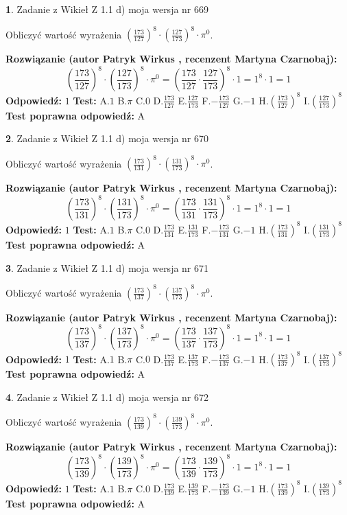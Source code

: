 \documentclass[12pt, a4paper]{article}
\theoremstyle{definition} %
\newtheorem{zad}{}
\newcommand{\zadStart}[1]{\begin{zad}#1\newline}
\newcommand{\zadStop}{\end{zad}}
\newcommand{\rozwStart}[2]{\noindent \textbf{Rozwiązanie (autor #1 , recenzent #2): }\newline}
\newcommand{\rozwStop}{\newline}
\newcommand{\odpStart}{\noindent \textbf{Odpowiedź:}\newline}
\newcommand{\odpStop}{\newline}
\newcommand{\testStart}{\noindent \textbf{Test:}\newline}
\newcommand{\testStop}{\newline}
\newcommand{\kluczStart}{\noindent \textbf{Test poprawna odpowiedź:}\newline}
\newcommand{\kluczStop}{\newline}
\begin{document}
\zadStart{Zadanie z Wikieł Z 1.1 d) moja wersja nr 669}

Obliczyć wartość wyrażenia $(\frac{173}{127})^{8} \cdot (\frac{127}{173})^{8} \cdot \pi^{0}$.
\zadStop
\rozwStart{Patryk Wirkus}{Martyna Czarnobaj}
$$(\frac{173}{127})^{8} \cdot (\frac{127}{173})^{8} \cdot \pi^{0} = (\frac{173}{127} \cdot \frac{127}{173})^{8} \cdot 1 = 1^{8} \cdot 1 = 1$$
\rozwStop
\odpStart
$1$
\odpStop
\testStart
A.$1$ B.$\pi$ C.$0$ D.$\frac{173}{127}$ E.$\frac{127}{173}$
F.$-\frac{173}{127}$ G.$-1$
H.$(\frac{173}{127})^{8}$
I.$(\frac{127}{173})^{8}$
\testStop
\kluczStart
A
\kluczStop



\zadStart{Zadanie z Wikieł Z 1.1 d) moja wersja nr 670}

Obliczyć wartość wyrażenia $(\frac{173}{131})^{8} \cdot (\frac{131}{173})^{8} \cdot \pi^{0}$.
\zadStop
\rozwStart{Patryk Wirkus}{Martyna Czarnobaj}
$$(\frac{173}{131})^{8} \cdot (\frac{131}{173})^{8} \cdot \pi^{0} = (\frac{173}{131} \cdot \frac{131}{173})^{8} \cdot 1 = 1^{8} \cdot 1 = 1$$
\rozwStop
\odpStart
$1$
\odpStop
\testStart
A.$1$ B.$\pi$ C.$0$ D.$\frac{173}{131}$ E.$\frac{131}{173}$
F.$-\frac{173}{131}$ G.$-1$
H.$(\frac{173}{131})^{8}$
I.$(\frac{131}{173})^{8}$
\testStop
\kluczStart
A
\kluczStop



\zadStart{Zadanie z Wikieł Z 1.1 d) moja wersja nr 671}

Obliczyć wartość wyrażenia $(\frac{173}{137})^{8} \cdot (\frac{137}{173})^{8} \cdot \pi^{0}$.
\zadStop
\rozwStart{Patryk Wirkus}{Martyna Czarnobaj}
$$(\frac{173}{137})^{8} \cdot (\frac{137}{173})^{8} \cdot \pi^{0} = (\frac{173}{137} \cdot \frac{137}{173})^{8} \cdot 1 = 1^{8} \cdot 1 = 1$$
\rozwStop
\odpStart
$1$
\odpStop
\testStart
A.$1$ B.$\pi$ C.$0$ D.$\frac{173}{137}$ E.$\frac{137}{173}$
F.$-\frac{173}{137}$ G.$-1$
H.$(\frac{173}{137})^{8}$
I.$(\frac{137}{173})^{8}$
\testStop
\kluczStart
A
\kluczStop



\zadStart{Zadanie z Wikieł Z 1.1 d) moja wersja nr 672}

Obliczyć wartość wyrażenia $(\frac{173}{139})^{8} \cdot (\frac{139}{173})^{8} \cdot \pi^{0}$.
\zadStop
\rozwStart{Patryk Wirkus}{Martyna Czarnobaj}
$$(\frac{173}{139})^{8} \cdot (\frac{139}{173})^{8} \cdot \pi^{0} = (\frac{173}{139} \cdot \frac{139}{173})^{8} \cdot 1 = 1^{8} \cdot 1 = 1$$
\rozwStop
\odpStart
$1$
\odpStop
\testStart
A.$1$ B.$\pi$ C.$0$ D.$\frac{173}{139}$ E.$\frac{139}{173}$
F.$-\frac{173}{139}$ G.$-1$
H.$(\frac{173}{139})^{8}$
I.$(\frac{139}{173})^{8}$
\testStop
\kluczStart
A
\kluczStop
\end{document}

